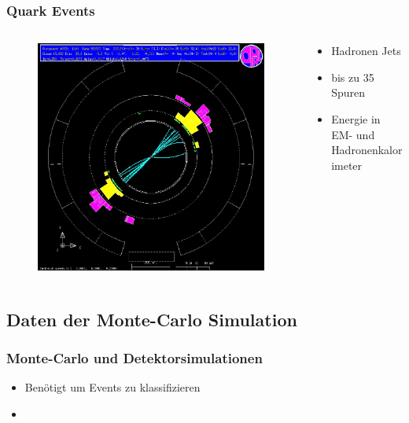 \begin{frame}
	\frametitle{Quark Events}
	\begin{columns}[T] %
		\begin{column}{.54\textwidth}
			\begin{figure}
				\centering
				\includegraphics[width=1.0\linewidth]{graphics/quarkopal}
			\end{figure}
		\end{column}%
		\hfill%
		\begin{column}{.42\textwidth}
			\begin{center}
				\begin{itemize}
					\item Hadronen Jets
					\item bis zu 35 Spuren
					\item Energie in EM- und Hadronenkalorimeter
				\end{itemize}
			\end{center}
		\end{column}%
	\end{columns}
	
\end{frame}
\subsection{Daten der Monte-Carlo Simulation}
\begin{frame}
	\frametitle{Monte-Carlo und Detektorsimulationen}
	\begin{center}
		\begin{itemize}
			\item Benötigt um Events zu klassifizieren
			\item 
		\end{itemize}
	\end{center}
\end{frame}
